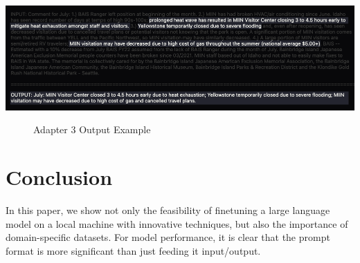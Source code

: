 \documentclass[12pt]{article}
\begin{document}
\begin{center}
    \includegraphics[width=1\textwidth]{../Visuals/OutputExample.png}
    \begin{figure}
        \caption{Adapter 3 Output Example}
    \end{figure}
\end{center}

\section{Conclusion}
In this paper, we show not only the feasibility of finetuning a large language model on a local machine with innovative techniques, but also the importance of domain-specific datasets. For model performance, it is clear that the prompt format is more significant than just feeding it input/output.







 

\end{document}
